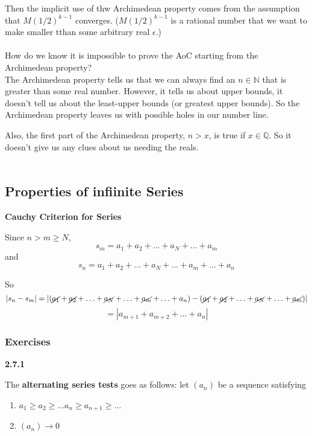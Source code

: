 Then the implicit use of thw Archimedean property comes from the assumption that $M(1/2)^{k-1}$
converges.
($M(1/2)^{k-1}$ is a rational number that we want to make smaller tthan some arbitrary real $\epsilon$.)
\\~\\

How do we know it is impossible to prove the AoC starting from the Archimedean property?
\\

The Archimedean property tells us that we can always find an $n\in\mathbb{N}$
that is greater than some real number.
However, it tells us about upper bounds, it doesn't tell us about the least-upper bounds
(or greatest upper bounds).
So the Archimedean property leaves us with possible holes in our number line.

Also, the first part of the Archimedean property, $n>x$, is true if $x\in\mathbb{Q}$.
So it doesn't give us any clues about us needing the reals.
\\~\\



\subsection{Properties of infiinite Series}

\textbf{Cauchy Criterion for Series}

Since $n > m \geq N$,
$$
s_m = a_1 + a_2 + \ldots + a_N + \ldots + a_m
$$
and
$$
s_n = a_1 + a_2 + \ldots + a_N + \ldots + a_m + \ldots + a_n
$$

So
$$
|s_n - s_m| = 
\left| (\cancel{a_1} + \cancel{a_2} + \ldots + \cancel{a_N} + \ldots + \cancel{a_m} + \ldots + a_n) - 
(\cancel{a_1} + \cancel{a_2} + \ldots + \cancel{a_N} + \ldots + \cancel{a_m})\right|
$$
$$
= \left| a_{m+1} + a_{m+2} + \ldots + a_n \right|
$$



\subsubsection{Exercises}


\textbf{2.7.1}

The \textbf{alternating series tests} goes as follows:
let $(a_n)$ be a sequence satisfying
\begin{enumerate}
    \item $a_1 \geq a_2 \geq \ldots a_n \geq a_{n+1} \geq \ldots$
    \item $(a_n) \rightarrow 0$
\end{enumerate}


